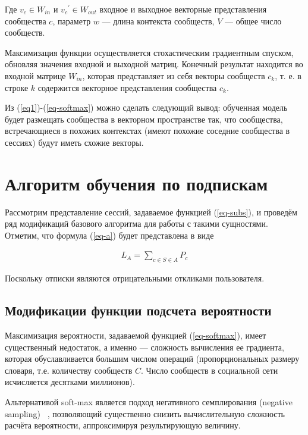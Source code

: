 \documentclass[times,specification,annotation]{itmo-student-thesis}
\begin{document}
Где ${v_c}\in W_{in}$ и ${v_c}^{'} \in W_{out}$ входное и выходное векторные представления сообщества $c$, параметр $w$ --- длина контекста сообществ, $V$ --- общее число сообществ. 

Максимизация функции осуществляется стохастическим градиентным спуском, обновляя значения входной и выходной матриц. Конечный результат находится во входной матрице $W_{in}$, которая представляет из себя векторы сообществ $c_k$, т. е. в строке $k$ содержится векторное
представления сообщества $c_k$.

Из (\ref{eq1})-(\ref{eq-softmax}) можно сделать следующий вывод: обученная модель будет размещать сообщества в векторном пространстве так, что сообщества, встречающиеся в похожих контекстах (имеют похожие соседние сообщества в сессиях) будут иметь схожие векторы.  

\section{Алгоритм обучения по подпискам}\label{sec:algo-subs}
Рассмотрим представление сессий, задаваемое функцией (\ref{eq-subs}), и проведём ряд модификаций базового алгоритма для работы с такими сущностями. Отметим, что формула (\ref{eq-a}) будет представлена в виде

\begin{align}
L_A = \sum_{c \in S \in A} P_c
\label{eq-a-mod}
\end{align}

Поскольку отписки являются отрицательными откликами пользователя.
 
\subsection{Модификации функции подсчета вероятности }\label{sec:prob}
Максимизация вероятности, задаваемой функцией
(\ref{eq-softmax}), имеет существенный недостаток, а именно --- сложность вычисления ее градиента, которая обуславливается большим числом операций (пропорциональных размеру словаря, т.е. количеству сообществ $C$. Число сообществ в социальной сети исчисляется десятками миллионов).

Альтернативой soft-max является подход негативного семплирования (negative sampling) ~\cite{mikolov2013distributed}, позволяющий существенно снизить вычислительную сложность расчёта вероятности, аппроксимируя результирующую величину.
\end{document}
